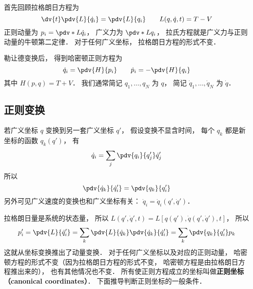 
\begin{issues}
\issueDraft
\end{issues}


首先回顾拉格朗日方程为
\begin{equation}
\dv{t} \pdv{L}{\dot q_i}  = \pdv{L}{q_i}  \qquad L(q,\dot q, t) = T - V
\end{equation}
正则动量为 $p_i = \pdv*{L}{\dot q_i}$， 广义力为 $\pdv*{L}{q_i}$，  拉氏方程就是广义力与正则动量的牛顿第二定律． 对于任何广义坐标， 拉格朗日方程的形式不变．

勒让德变换后， 得到哈密顿正则方程为
\begin{equation}
\dot q_i = \pdv{H}{p_i} \qquad
\dot p_i = -\pdv{H}{q_i}
\end{equation} 
其中 $H(p,q) = T + V$． 我们通常简记 $q_1, \dots, q_N$ 为 $q$， 简记 $\dot q_1, \dots, \dot q_N$ 为 $\dot q$．

\subsection{正则变换}

若广义坐标 $q$ 变换到另一套广义坐标 $q'$， 假设变换不显含时间， 每个 $q_k$ 都是新坐标的函数 $q_k(q')$， 有
\begin{equation}
\dot q_i = \sum_j \pdv{q_i}{q'_j} \dot q'_j
\end{equation}
所以
\begin{equation}
\pdv{\dot q_k}{\dot q'_i} = \pdv{q_k}{q'_i}
\end{equation}
另外可见广义速度的变换也和广义坐标有关： $\dot q_i = \dot q_i(q', \dot q')$．

拉格朗日量是系统的状态量， 所以 $L(q',\dot q', t) = L[q(q'),\dot q(q',\dot q'), t]$，  所以
\begin{equation}
p'_i = \pdv{L}{\dot q'_i} = \sum_k \pdv{L}{\dot q_k} \pdv{\dot q_k}{\dot q'_i}  = \sum_k \pdv{q_k}{q'_i} p_k
\end{equation}
这就从坐标变换推出了动量变换． 对于任何广义坐标以及对应的正则动量， 哈密顿方程的形式不变（因为拉格朗日方程的形式不变， 哈密顿方程是由拉格朗日方程推出来的）， 也有其他情况也不变． 所有使正则方程成立的坐标叫做\textbf{正则坐标（canonical coordinates）}． 下面推导判断正则坐标的一般条件．

